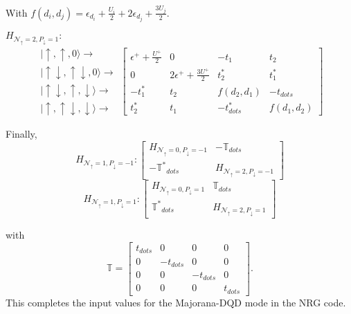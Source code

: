 With $f(d_{i},d_{j})=\epsilon_{d_{i}}+\frac{U_{i}}{2}+2\epsilon_{d_{j}}+\frac{3U_{j}}{2}.$

$H_{\mathcal{N}_{\uparrow}=2,P_{\downarrow}=1}:$
\[
\begin{array}{c}
\vert\uparrow,\uparrow,0\rangle\rightarrow\\
\vert\uparrow\!\downarrow,\uparrow\!\downarrow,0\rangle\rightarrow\\
\vert\uparrow\!\downarrow,\uparrow,\downarrow\rangle\rightarrow\\
\vert\uparrow,\uparrow\!\downarrow,\downarrow\rangle\rightarrow
\end{array}\left[\begin{array}{cccc}
\epsilon^{+}+\frac{U^{+}}{2} & 0 & -t_{1} & t_{2}\\
0 & 2\epsilon^{+}+\frac{3U^{+}}{2} & t_{2}^{*} & t_{1}^{*}\\
-t_{1}^{*} & t_{2} & f(d_{2},d_{1}) & -t_{dots}\\
t_{2}^{*} & t_{1} & -t^{*}_{dots} & f(d_{1},d_{2})
\end{array}\right]
\]

Finally, 
 $$H_{\mathcal{N}_{\uparrow}=1,P_{\downarrow}=-1}: \left[\begin{array}{cc}
H_{\mathcal{N}_{\uparrow}=0,P_{\downarrow}=-1} & -\mathbb{T}_{dots}\\
-\mathbb{T^{*}}_{dots} & H_{\mathcal{N}_{\uparrow}=2,P_{\downarrow}=-1}
\end{array}\right]
$$
$$H_{\mathcal{N}_{\uparrow}=1,P_{\downarrow}=1}: \left[\begin{array}{cc}
H_{\mathcal{N}_{\uparrow}=0,P_{\downarrow}=1} & \mathbb{T}_{dots}\\
\mathbb{T^{*}}_{dots} & H_{\mathcal{N}_{\uparrow}=2,P_{\downarrow}=1}
\end{array}\right] 
 $$

with 
$$\mathbb{T}=\left[\begin{array}{cccc}
t_{dots} & 0 & 0 & 0\\
0 & -t_{dots} & 0 & 0\\
0 & 0 & -t_{dots} & 0\\
0 & 0 & 0 & t_{dots}
\end{array}\right]. $$
This completes the input values for the Majorana-DQD mode in the NRG code. 


